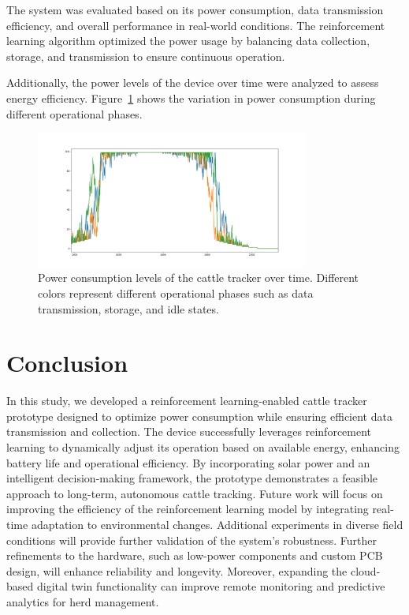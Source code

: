 \documentclass[10pt]{cai}
\begin{document}
The system was evaluated based on its power consumption, data transmission efficiency, and overall performance in real-world conditions. The reinforcement learning algorithm optimized the power usage by balancing data collection, storage, and transmission to ensure continuous operation.

Additionally, the power levels of the device over time were analyzed to assess energy efficiency. Figure~\ref{fig:power_levels} shows the variation in power consumption during different operational phases.

\begin{figure}[htbp]
    \centering
    \includegraphics[width=0.8\textwidth]{./figs/power_levels.png}
    \caption{Power consumption levels of the cattle tracker over time. Different colors represent different operational phases such as data transmission, storage, and idle states.}
    \label{fig:power_levels}
\end{figure}

\section{Conclusion}
In this study, we developed a reinforcement learning-enabled cattle tracker prototype designed to optimize power consumption while ensuring efficient data transmission and collection. The device successfully leverages reinforcement learning to dynamically adjust its operation based on available energy, enhancing battery life and operational efficiency. By incorporating solar power and an intelligent decision-making framework, the prototype demonstrates a feasible approach to long-term, autonomous cattle tracking.
Future work will focus on improving the efficiency of the reinforcement learning model by integrating real-time adaptation to environmental changes. Additional experiments in diverse field conditions will provide further validation of the system's robustness. Further refinements to the hardware, such as low-power components and custom PCB design, will enhance reliability and longevity. Moreover, expanding the cloud-based digital twin functionality can improve remote monitoring and predictive analytics for herd management.
\end{document}
